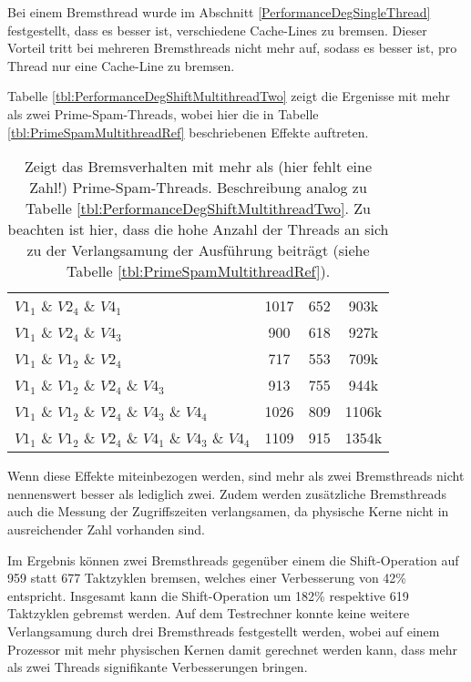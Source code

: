Bei einem Bremsthread wurde im Abschnitt \ref{PerformanceDegSingleThread} festgestellt, dass es besser ist, verschiedene Cache-Lines zu bremsen.
Dieser Vorteil tritt bei mehreren Bremsthreads nicht mehr auf, sodass es besser ist, pro Thread nur eine Cache-Line zu bremsen.

Tabelle \ref{tbl:PerformanceDegShiftMultithreadTwo} zeigt die Ergenisse mit mehr als zwei Prime-Spam-Threads, wobei hier die in Tabelle \ref{tbl:PrimeSpamMultithreadRef} beschriebenen Effekte auftreten.

\begin{table}[h]
\caption{Zeigt das Bremsverhalten mit mehr als (hier fehlt eine Zahl!) Prime-Spam-Threads. Beschreibung analog zu Tabelle \ref{tbl:PerformanceDegShiftMultithreadTwo}. Zu beachten ist hier, dass die hohe Anzahl der Threads an sich zu der Verlangsamung der Ausführung beiträgt (siehe Tabelle \ref{tbl:PrimeSpamMultithreadRef}).}
\label{tbl:PerformanceDegShiftMultithreadThreePlus}
\begin{tabular}{lccc}
$V1_1$ \& $V2_4$ \& $V4_1$                             & 1017  & 652 & 903k    \\
$V1_1$ \& $V2_4$ \& $V4_3$                            & 900   & 618 & 927k    \\
$V1_1$ \& $V1_2$ \& $V2_4$                             & 717   & 553 & 709k    \\
$V1_1$ \& $V1_2$ \& $V2_4$ \& $V4_3$                      & 913   & 755 & 944k    \\
$V1_1$ \& $V1_2$ \& $V2_4$ \& $V4_3$ \& $V4_4$               & 1026  & 809 & 1106k   \\
$V1_1$ \& $V1_2$ \& $V2_4$ \& $V4_1$ \& $V4_3$ \& $V4_4$         & 1109  & 915 & 1354k  
\end{tabular}
\end{table}

Wenn diese Effekte miteinbezogen werden, sind mehr als zwei Bremsthreads nicht nennenswert besser als lediglich zwei.
Zudem werden zusätzliche Bremsthreads auch die Messung der Zugriffszeiten verlangsamen, da physische Kerne nicht in ausreichender Zahl vorhanden sind.

Im Ergebnis können zwei Bremsthreads gegenüber einem die Shift-Operation auf 959 statt 677 Taktzyklen bremsen, welches einer Verbesserung von 42\% entspricht.
Insgesamt kann die Shift-Operation um 182\% respektive 619 Taktzyklen gebremst werden.
Auf dem Testrechner konnte keine weitere Verlangsamung durch drei Bremsthreads festgestellt werden, wobei auf einem Prozessor mit mehr physischen Kernen damit gerechnet werden kann, dass mehr als zwei Threads signifikante Verbesserungen bringen.


